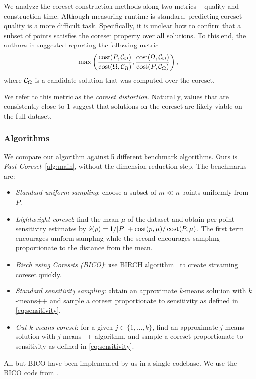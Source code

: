 We analyze the coreset construction methods along two metrics -- quality and construction time.  Although measuring runtime is standard, predicting coreset
quality is a more difficult task. Specifically, it is unclear how to confirm that a subset of points satisfies the coreset property over all solutions. To this
end, the authors in \cite{chrisESA} suggested reporting the following metric 
\[ \max \left( \dfrac{\operatorname{cost}(P, \mathcal C_{\Omega})}{\operatorname{cost}(\Omega, \mathcal C_{\Omega})}, \dfrac{\operatorname{cost}(\Omega, \mathcal C_{\Omega})}{\operatorname{cost}(P, \mathcal C_{\Omega})} \right),\]
where $\mathcal C_{\Omega}$ is a candidate solution that was computed over the coreset.

We refer to this metric as the \emph{coreset distortion}. Naturally, values that are consistently close to $1$ suggest that solutions on the coreset are likely
viable on the full dataset.


\subsubsection{Algorithms}
\label{ssec:algorithms}
We compare our algorithm against 5 different benchmark algorithms. Ours is \emph{Fast-Coreset}~\ref{alg:main}, without the dimension-reduction step. The benchmarks are:
\begin{itemize}
        \item \emph{Standard uniform sampling}: choose a subset of $m \ll n$ points uniformly from $P$.
        \item \emph{Lightweight coreset}: find the mean $\mu$ of the dataset and obtain per-point sensitivity estimates by $\hat{s}(p) = 1/|P| + \operatorname{cost}(p, \mu) / \operatorname{cost}(P, \mu)$.
            The first term encourages uniform sampling while the second encourages sampling proportionate to the distance from the mean.
        \item \emph{Birch using Coresets (BICO)}: use BIRCH algorithm~\cite{birch} to create streaming coreset quickly. 
        \item \emph{Standard sensitivity sampling}: obtain an approximate $k$-means solution with $k$-means++ and sample a coreset proportionate to sensitivity as defined in \cref{eq:sensitivity}.
        \item \emph{Cut-$k$-means coreset}: for a given $j \in \{1,..., k\}$, find an approximate $j$-means solution with $j$-means++ algorithm, and sample
            a coreset proportionate to sensitivity as defined in \cref{eq:sensitivity}.\end{itemize}
All but BICO have been implemented by us in a single codebase. We use the BICO code from \cite{bico}.

